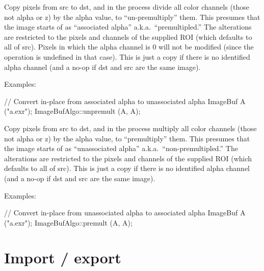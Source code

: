  
Copy pixels from {\cf src} to {\cf dst}, and in the process 
divide all color channels (those not alpha or z) 
by the alpha value, to ``un-premultiply'' them.  This presumes that the
image starts of as ``associated alpha'' a.k.a.\ ``premultipled.''  The
alterations are restricted to the pixels and channels of the supplied
ROI (which defaults to all of {\cf src}).  Pixels in which the alpha
channel is 0 will not be modified (since the operation is undefined in
that case).  This is just a copy if there is no identified alpha channel
(and a no-op if {\cf dst} and {\cf src} are the same image).

\smallskip
\noindent Examples:
\begin{code}
    // Convert in-place from associated alpha to unassociated alpha
    ImageBuf A ("a.exr");
    ImageBufAlgo::unpremult (A, A);
\end{code}
\apiend

 
Copy pixels from {\cf src} to {\cf dst}, and in the process 
multiply all color channels (those not alpha or z) 
by the alpha value, to ``premultiply'' them.  This presumes that the
image starts of as ``unassociated alpha'' a.k.a.\ ``non-premultipled.''
The alterations are restricted to the pixels and channels of the
supplied ROI (which defaults to all of {\cf src}).  This is just a copy
if there is no identified alpha channel
(and a no-op if {\cf dst} and {\cf src} are the same image).

\smallskip
\noindent Examples:
\begin{code}
    // Convert in-place from unassociated alpha to associated alpha
    ImageBuf A ("a.exr");
    ImageBufAlgo::premult (A, A);
\end{code}
\apiend



\section{Import / export}
\label{sec:iba:importexport}

 

